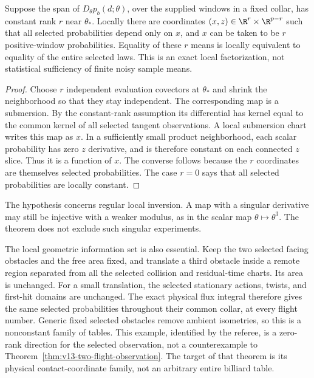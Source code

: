 \begin{corollary}
\label{cor:v14-observable-quotient}
Suppose the span of $D_\theta p_b(d;\theta)$, over the supplied
windows in a fixed collar, has constant rank $r$ near $\theta_*$.
Locally there are coordinates $(x,z)\in\R^r\times\R^{p-r}$ such
that all selected probabilities depend only on $x$, and $x$ can be
taken to be $r$ positive-window probabilities. Equality of these $r$
means is locally equivalent to equality of the entire selected laws.
This is an exact local factorization, not statistical sufficiency of
finite noisy sample means.
\end{corollary}
\begin{proof}
Choose $r$ independent evaluation covectors at $\theta_*$ and shrink
the neighborhood so that they stay independent. The corresponding
map is a submersion. By the constant-rank assumption its differential
has kernel equal to the common kernel of all selected tangent
observations. A local submersion chart writes this map as $x$. In a sufficiently small
product neighborhood, each scalar probability has zero $z$ derivative,
and is therefore constant on each connected $z$ slice. Thus it is a
function of $x$. The converse follows because the $r$ coordinates
are themselves selected probabilities. The case $r=0$ says that all
selected probabilities are locally constant.
\end{proof}

The hypothesis concerns regular local inversion. A map with a singular
derivative may still be injective with a weaker modulus, as in the
scalar map $\theta\mapsto\theta^3$. The theorem does not exclude
such singular experiments.

The local geometric information set is also essential. Keep the two
selected facing obstacles and the free area fixed, and translate a
third obstacle inside a remote region separated from all the selected
collision and residual-time charts. Its area is unchanged. For a
small translation, the selected stationary actions, twists, and
first-hit domains are unchanged. The exact physical flux integral
therefore gives the same selected probabilities throughout their
common collar, at every flight number. Generic fixed selected
obstacles remove ambient isometries, so this is a nonconstant family
of tables. This example, identified by the referee, is a zero-rank
direction for the selected observation, not a counterexample to
Theorem~\ref{thm:v13-two-flight-observation}. The target of that theorem
is its physical contact-coordinate family, not an arbitrary entire
billiard table.

